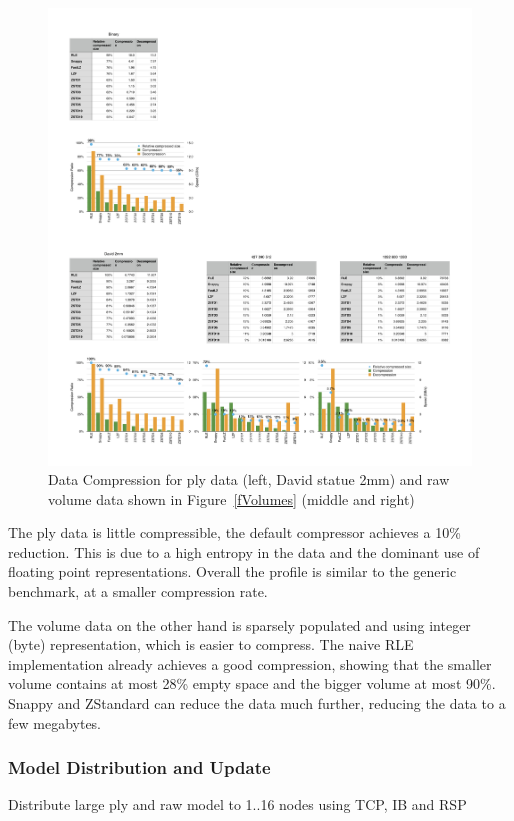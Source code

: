 \documentclass[10pt,journal,compsoc]{IEEEtran}
\newcommand{\fig}[1]{Figure~\ref{#1}}
\begin{document}
\begin{figure}[ht]\center
  \includegraphics[width=\textwidth]{images/compressorDetail}
  \caption{\label{fCompressorDetail}Data Compression for ply data (left, David
    statue 2mm) and raw volume data shown in \fig{fVolumes} (middle and right)}
\end{figure}

The ply data is little compressible, the default compressor achieves a 10\%
reduction. This is due to a high entropy in the data and the dominant use of
floating point representations. Overall the profile is similar to the generic
benchmark, at a smaller compression rate.

The volume data on the other hand is sparsely populated and using integer (byte)
representation, which is easier to compress. The naive RLE implementation
already achieves a good compression, showing that the smaller volume contains at
most 28\% empty space and the bigger volume at most 90\%. Snappy and ZStandard
can reduce the data much further, reducing the data to a few megabytes.


\subsubsection{Model Distribution and Update}
Distribute large ply and raw model to 1..16 nodes using TCP, IB and RSP
\end{document}
